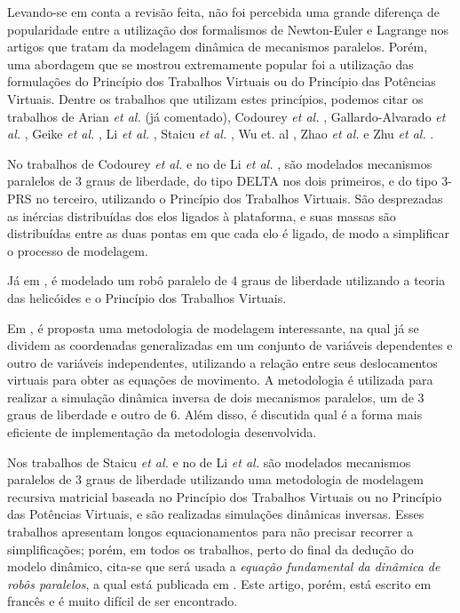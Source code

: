\documentclass[]{politex}
\begin{document}
Levando-se em conta a revisão feita, não foi percebida uma grande diferença de popularidade entre a utilização dos formalismos de Newton-Euler e Lagrange nos artigos que tratam da modelagem dinâmica de mecanismos paralelos. Porém, uma abordagem que se mostrou extremamente popular foi a utilização das formulações do Princípio dos Trabalhos Virtuais ou do Princípio das Potências Virtuais. Dentre os trabalhos que utilizam estes princípios, podemos citar os trabalhos de Arian \emph{et al.} \cite{Arian} (já comentado), Codourey \emph{et al.} \cite{Codourey, CodoureyBurdet}, Gallardo-Alvarado \emph{et al.} \cite{GallardoAlvarado}, Geike \emph{et al.} \cite{Geike}, Li \emph{et al.} \cite{LiStaicu, Li}, Staicu \emph{et al.} \cite{Staicu, Staicu2, Staicu3, StaicuCarpCiocardia, StaicuLiu, StaicuZhang, StaicuZhangRugescu}, Wu et. al \cite{Wu}, Zhao \emph{et al.} \cite{Zhao, Zhao2} e  Zhu \emph{et al.} \cite{Zhu}.

No trabalhos de Codourey \emph{et al.} \cite{Codourey, CodoureyBurdet} e no de Li \emph{et al.} \cite{Li}, são modelados mecanismos paralelos de 3 graus de liberdade, do tipo DELTA nos dois primeiros, e do tipo 3-PRS no terceiro, utilizando o Princípio dos Trabalhos Virtuais. São desprezadas as inércias distribuídas dos elos ligados à plataforma, e suas massas são distribuídas entre as duas pontas em que cada elo é ligado, de modo a simplificar o processo de modelagem.

Já em \cite{GallardoAlvarado}, é modelado um robô paralelo de 4 graus de liberdade utilizando a teoria das helicóides e o Princípio dos Trabalhos Virtuais.

Em \cite{Geike}, é proposta uma metodologia de modelagem interessante, na qual já se dividem as coordenadas generalizadas em um conjunto de variáveis dependentes e outro de variáveis independentes, utilizando a relação entre seus deslocamentos virtuais para obter as equações de movimento. A metodologia é utilizada para realizar a simulação dinâmica inversa de dois mecanismos paralelos, um de 3 graus de liberdade e outro de 6. Além disso, é discutida qual é a forma mais eficiente de implementação da metodologia desenvolvida.

Nos trabalhos de Staicu \emph{et al.} \cite{Staicu, Staicu2, Staicu3, StaicuCarpCiocardia, StaicuLiu, StaicuZhang, StaicuZhangRugescu} e no de Li \emph{et al.} \cite{LiStaicu} são modelados mecanismos paralelos de 3 graus de liberdade utilizando uma metodologia de modelagem recursiva matricial baseada no Princípio dos Trabalhos Virtuais ou no Princípio das Potências Virtuais, e são realizadas simulações dinâmicas inversas. Esses trabalhos apresentam longos equacionamentos para não precisar recorrer a simplificações; porém, em todos os trabalhos, perto do final da dedução do modelo dinâmico, cita-se que será usada a \emph{equação fundamental da dinâmica de robôs paralelos}, a qual está publicada em \cite{StaicuFrances}. Este artigo, porém, está escrito em francês e é muito difícil de ser encontrado.
\end{document}
